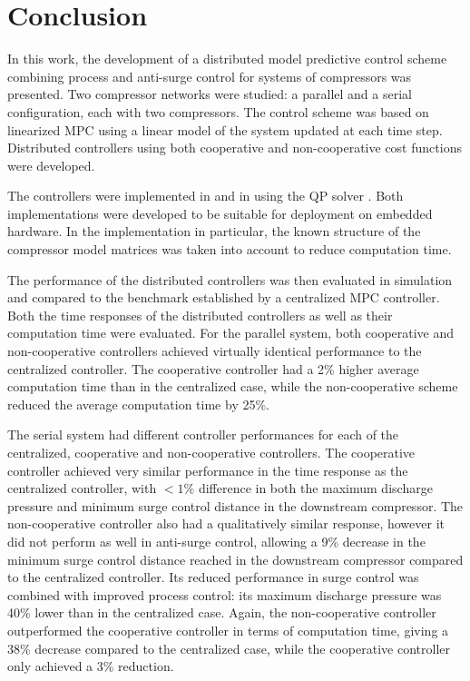 \chapter{Conclusion}
\label{sec:conclusion}

In this work, the development of a distributed model predictive control scheme combining process and anti-surge control for systems of compressors was presented.
Two compressor networks were studied: a parallel and a serial configuration, each with two compressors.
The control scheme was based on linearized MPC using a linear model of the system updated at each time step.
Distributed controllers using both cooperative and non-cooperative cost functions were developed.

The controllers were implemented in \slink{} and in \cpp{} using the QP solver \qpoases{}.
Both implementations were developed to be suitable for deployment on embedded hardware.
In the \cpp{} implementation in particular, the known structure of the compressor model matrices was taken into account to reduce computation time.

The performance of the distributed controllers was then evaluated in simulation and compared to the benchmark established by a centralized MPC controller.
Both the time responses of the distributed controllers as well as their computation time were evaluated.
For the parallel system, both cooperative and non-cooperative controllers achieved virtually identical performance to the centralized controller.
The cooperative controller had a 2\% higher average computation time than in the centralized case, while the non-cooperative scheme reduced the average computation time by 25\%.

The serial system had different controller performances for each of the centralized, cooperative and non-cooperative controllers.
The cooperative controller achieved very similar performance in the time response as the centralized controller, with $<1\%$ difference in both the maximum discharge pressure and minimum surge control distance in the downstream compressor.
The non-cooperative controller also had a qualitatively similar response, however it did not perform as well in anti-surge control, allowing a 9\% decrease in the minimum surge control distance reached in the downstream compressor compared to the centralized controller.
Its reduced performance in surge control was combined with improved process control: its maximum discharge pressure was 40\% lower than in the centralized case.
Again, the non-cooperative controller outperformed the cooperative controller in terms of computation time, giving a 38\% decrease compared to the centralized case, while the cooperative controller only achieved a 3\% reduction.  

